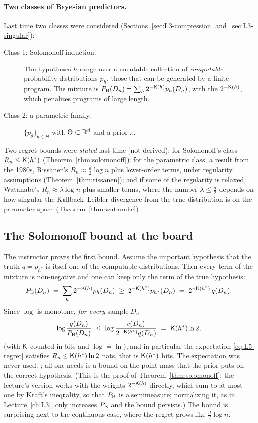 \paragraph{Two classes of Bayesian predictors.}
Last time two classes were considered (Sections~\ref{sec:L3-compression} and~\ref{sec:L3-singular}):
\begin{description}
  \item[Class 1: Solomonoff induction.] The hypotheses $h$ range over a countable collection of \emph{computable} probability distributions $p_h$, those that can be generated by a finite program. The mixture is $P_{\mathrm{B}}(D_n)=\sum_h2^{-\mathsf{K}(h)}p_h(D_n)$, with the  $2^{-\mathsf{K}(h)}$, which penalizes programs of large length.
  \item[Class 2: a parametric family.] $\{p_\theta\}_{\theta\in\Theta}$ with $\Theta\subset\mathbb{R}^d$ and a prior $\pi$.
\end{description}
Two regret bounds were \emph{stated} last time (not derived): for Solomonoff's class $R_n\le\mathsf{K}(h^*)$ (Theorem~\ref{thm:solomonoff}); for the parametric class, a result from the 1980s, Rissanen's $R_n\approx\frac d2\log n$ plus lower-order terms, under regularity assumptions (Theorem~\ref{thm:rissanen}); and if some of the regularity is relaxed, Watanabe's $R_n\approx\lambda\log n$ plus smaller terms, where the number $\lambda\le\frac d2$ depends on how singular the Kullback--Leibler divergence from the true distribution is on the parameter space (Theorem~\ref{thm:watanabe}).

\subsection{The Solomonoff bound at the board}\label{sec:L5-solomonoff-proof}
The instructor proves the first bound. Assume the important hypothesis that the truth $q=p_{h^*}$ is itself one of the computable distributions. Then every term of the mixture is non-negative and one can keep only the term of the true hypothesis:
\[
  P_{\mathrm{B}}(D_n)\;=\;\sum_h2^{-\mathsf{K}(h)}p_h(D_n)\;\ge\;2^{-\mathsf{K}(h^*)}p_{h^*}(D_n)\;=\;2^{-\mathsf{K}(h^*)}\,q(D_n).
\]
Since $\log$ is monotone, \emph{for every} sample $D_n$
\[
  \log\frac{q(D_n)}{P_{\mathrm{B}}(D_n)}\;\le\;\log\frac{q(D_n)}{2^{-\mathsf{K}(h^*)}q(D_n)}\;=\;\mathsf{K}(h^*)\ln2 ,
\]
(with $\mathsf{K}$ counted in bits and $\log=\ln$), and in particular the expectation \eqref{eq:L5-regret} satisfies $R_n\le\mathsf{K}(h^*)\ln2$ nats, that is $\mathsf{K}(h^*)$ bits. The expectation was never used: ; all one needs is a bound on the point mass that the prior puts on the correct hypothesis. (This is the proof of Theorem~\ref{thm:solomonoff}; the lecture's version works with the weights $2^{-\mathsf{K}(h)}$ directly, which sum to at most one by Kraft's inequality, so that $P_{\mathrm{B}}$ is a semimeasure; normalizing it, as in Lecture~\ref{ch:L3}, only increases $P_{\mathrm{B}}$ and the bound persists.) The bound is surprising next to the continuous case, where the regret grows like $\frac d2\log n$.

